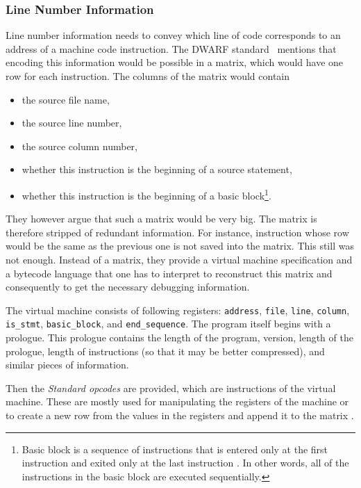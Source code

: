 \subsubsection{Line Number Information}
Line number information needs to convey which line of code corresponds to an
address of a machine code instruction. The DWARF standard~\cite{dwarf} mentions
that encoding this information would be possible in a matrix, which would have
one row for each instruction. The columns of the matrix would contain
\begin{itemize}
    \item the source file name,
    \item the source line number,
    \item the source column number,
    \item whether this instruction is the beginning of a source statement,
    \item whether this instruction is the beginning of a basic
        block\footnote{Basic block is a sequence of instructions that is
        entered only at the first instruction and exited only at the last
        instruction \cite{dwarf}. In other words, all of the instructions in
        the basic block are executed sequentially.}.
\end{itemize}
They however argue that such a matrix would be very big. The matrix is
therefore stripped of redundant information. For instance, instruction whose
row would be the same as the previous one is not saved into the matrix. This
still was not enough. Instead of a matrix, they provide a virtual machine
specification and a bytecode language that one has to interpret to reconstruct
this matrix and consequently to get the necessary debugging information.

The virtual machine consists of following registers: \texttt{address},
\texttt{file}, \texttt{line}, \texttt{column}, \texttt{is\_stmt},
\texttt{basic\_block}, and \texttt{end\_sequence}. The program itself begins
with a prologue. This prologue contains the length of the program, version,
length of the prologue, length of instructions (so that it may be better
compressed), and similar pieces of information. 

Then the \textit{Standard opcodes} are provided, which are instructions of the
virtual machine. These are mostly used for manipulating the registers of the
machine or to create a new row from the values in the registers and append it
to the matrix \cite{dwarf}. 

